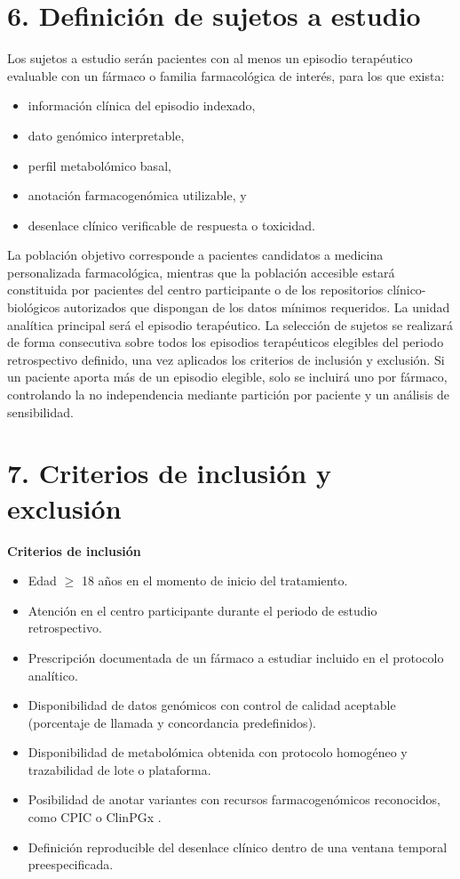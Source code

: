\documentclass[11pt,a4paper]{article}
\begin{document}
\section*{6. Definición de sujetos a estudio}
Los sujetos a estudio serán pacientes con al menos un episodio terapéutico
evaluable con un fármaco o familia farmacológica de interés, para los que
exista:
\begin{itemize}
    \item información clínica del episodio indexado,
    \item dato genómico interpretable,
    \item perfil metabolómico basal,
    \item anotación farmacogenómica utilizable, y
    \item desenlace clínico verificable de respuesta o toxicidad.
\end{itemize}

La población objetivo corresponde a pacientes candidatos a medicina
personalizada farmacológica, mientras que la población accesible estará
constituida por pacientes del centro participante o de los repositorios
clínico-biológicos autorizados que dispongan de los datos mínimos requeridos. La
unidad analítica principal será el episodio terapéutico. La selección de sujetos
se realizará de forma consecutiva sobre todos los episodios terapéuticos
elegibles del periodo retrospectivo definido, una vez aplicados los criterios de
inclusión y exclusión. Si un paciente aporta más de un episodio elegible, solo
se incluirá uno por fármaco, controlando la no independencia mediante partición
por paciente y un análisis de sensibilidad.

\section*{7. Criterios de inclusión y exclusión}
\textbf{Criterios de inclusión}
\begin{itemize}
    \item Edad $\geq$ 18 años en el momento de inicio del tratamiento.
    \item Atención en el centro participante durante el periodo de estudio
    retrospectivo.
    \item Prescripción documentada de un fármaco a estudiar incluido en el
    protocolo analítico.
    \item Disponibilidad de datos genómicos con control de calidad aceptable
    (porcentaje de llamada y concordancia predefinidos).
    \item Disponibilidad de metabolómica obtenida con protocolo homogéneo y
    trazabilidad de lote o plataforma.
    \item Posibilidad de anotar variantes con recursos farmacogenómicos
    reconocidos, como CPIC o ClinPGx \cite{cpic,clinpgx}.
    \item Definición reproducible del desenlace clínico dentro de una ventana
    temporal preespecificada.
\end{itemize}
\end{document}
